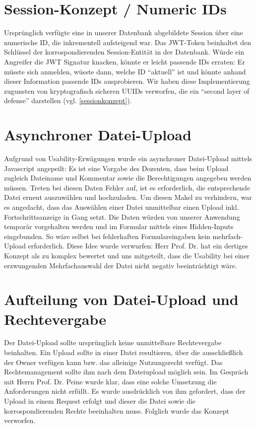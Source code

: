 \documentclass[12pt,DIV14,BCOR10mm,a4paper,parskip=half-,headsepline,headinclude,english,ngerman,bibliography=totocnumbered]{scrreprt}
\begin{document}
\section{Session-Konzept / Numeric IDs}
Ursprünglich verfügte eine in unserer Datenbank abgebildete Session über eine numerische ID, die inkrementell aufsteigend war. Das JWT-Token beinhaltet den Schlüssel der korrospondierenden Session-Entität in der Datenbank. Würde ein Angreifer die JWT Signatur knacken, könnte er leicht passende IDs erraten: Er müsste sich anmelden, wüsste dann, welche ID \enquote{aktuell} ist und könnte anhand dieser Information passende IDs ausprobieren. Wir haben diese Implementierung zugunsten von kryptografisch sicheren UUIDs verworfen, die ein \enquote{second layer of defense} darstellen (vgl. \ref{sessionkonzept}).

\section{Asynchroner Datei-Upload}
Aufgrund von Usability-Erwägungen wurde ein asynchroner Datei-Upload mittels Javascript angepeilt: Es ist eine Vorgabe des Dozenten, dass beim Upload zugleich Dateiname und Kommentar sowie die Berechtigungen angegeben werden müssen. Treten bei diesen Daten Fehler auf, ist es erforderlich, die entsprechende Datei erneut auszuwählen und hochzuladen. Um diesen Makel zu verhindern, war es angedacht, dass das Auswählen einer Datei unmittelbar einen Upload inkl. Fortschrittsanzeige in Gang setzt. Die Daten würden von unserer Anwendung temporär vorgehalten werden und im Formular mittels eines Hidden-Inputs eingebunden. 
So wäre selbst bei fehlerhaften Formulareingaben kein mehrfach-Upload erforderlich. Diese Idee wurde verwurfen: Herr Prof. Dr. hat ein dertiges Konzept als zu komplex bewertet und uns mitgeteilt, dass die Usability bei einer erzwungenden Mehrfachauswahl der Datei nicht negativ beeinträchtigt wäre.

\section{Aufteilung von Datei-Upload und Rechtevergabe}
Der Datei-Upload sollte ursprünglich keine unmittelbare Rechtevergabe beinhalten. Ein Upload sollte in einer Datei resultieren, über die ausschließlich der Owner verfügen kann bzw. das alleinige Nutzungsrecht verfügt. Das Rechtemanagement sollte ihm nach dem Dateiupload möglich sein. Im Gespräch mit Herrn Prof. Dr. Peine wurde klar, dass eine solche Umsetzung die Anforderungen nicht erfüllt. Es wurde ausdrücklich von ihm gefordert, dass der Upload in einem Request erfolgt und dieser die Datei sowie die korrospondierenden Rechte beeinhalten muss. Folglich wurde das Konzept verworfen.
\end{document}

